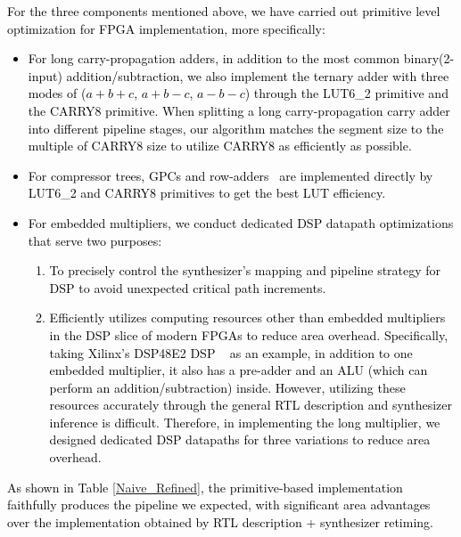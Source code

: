 \documentclass[conference]{IEEEtran}
\begin{document}
\textcolor{black}{
For the three components mentioned above, we have carried out primitive level optimization for FPGA implementation, more specifically:
\begin{itemize}
  \item For long carry-propagation adders, in addition to the most common binary(2-input) addition/subtraction, we also implement the ternary adder with three modes of ($a+b+c$, $a+b-c$, $a-b-c$) through the LUT6\_2 primitive and the CARRY8 primitive. When splitting a long carry-propagation carry adder into different pipeline stages, our algorithm matches the segment size to the multiple of CARRY8 size to utilize CARRY8 as efficiently as possible.
    \item For compressor trees, GPCs and row-adders~\cite{Arithmetic_core_generation_using_bit_heaps} are implemented directly by LUT6\_2 and CARRY8 primitives to get the best LUT efficiency.
    \item For embedded multipliers, we conduct dedicated DSP datapath optimizations that serve two purposes:
    \begin{enumerate}[(1)]
        \item To precisely control the synthesizer's mapping and pipeline strategy for DSP to avoid unexpected critical path increments.
        \item Efficiently utilizes computing resources other than embedded multipliers in the DSP slice of modern FPGAs to reduce area overhead. Specifically, taking Xilinx's DSP48E2 DSP ~\cite{UltraScale_Architecture_DSP_Slice_User_Guide} as an example, in addition to one embedded multiplier, it also has a pre-adder and an ALU (which can perform an addition/subtraction) inside. However, utilizing these resources accurately through the general RTL description and synthesizer inference is difficult. Therefore, in implementing the long multiplier, we designed dedicated DSP datapaths for three variations to reduce area overhead.
    \end{enumerate}
\end{itemize}
}

\textcolor{black}{
As shown in Table \ref{Naive_Refined}, the primitive-based implementation faithfully produces the pipeline we expected, with significant area advantages over the implementation obtained by RTL description + synthesizer retiming. 
}
\end{document}
